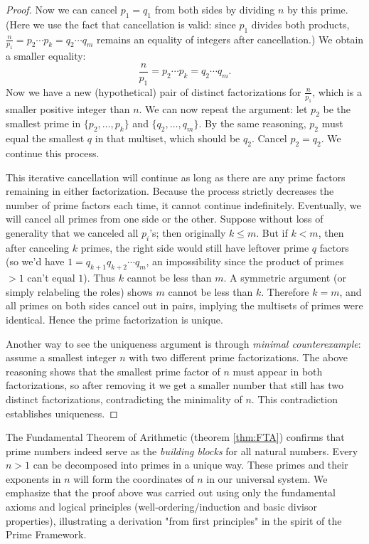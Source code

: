 \documentclass[11pt]{article}
\begin{document}
\begin{proof}
Now we can cancel $p_1 = q_1$ from both sides by dividing $n$ by this prime. (Here we use the fact that cancellation is valid: since $p_1$ divides both products, $\frac{n}{p_1} = p_2 \cdots p_k = q_2 \cdots q_m$ remains an equality of integers after cancellation.) We obtain a smaller equality:
\[ \frac{n}{p_1} = p_2 \cdots p_k = q_2 \cdots q_m. \]
Now we have a new (hypothetical) pair of distinct factorizations for $\frac{n}{p_1}$, which is a smaller positive integer than $n$. We can now repeat the argument: let $p_2$ be the smallest prime in $\{p_2,\dots,p_k\}$ and $\{q_2,\dots,q_m\}$. By the same reasoning, $p_2$ must equal the smallest $q$ in that multiset, which should be $q_2$. Cancel $p_2 = q_2$. We continue this process.

This iterative cancellation will continue as long as there are any prime factors remaining in either factorization. Because the process strictly decreases the number of prime factors each time, it cannot continue indefinitely. Eventually, we will cancel all primes from one side or the other. Suppose without loss of generality that we canceled all $p_i$'s; then originally $k \le m$. But if $k < m$, then after canceling $k$ primes, the right side would still have leftover prime $q$ factors (so we'd have $1 = q_{k+1} q_{k+2} \cdots q_{m}$, an impossibility since the product of primes $>1$ can’t equal $1$). Thus $k$ cannot be less than $m$. A symmetric argument (or simply relabeling the roles) shows $m$ cannot be less than $k$. Therefore $k = m$, and all primes on both sides cancel out in pairs, implying the multisets of primes were identical. Hence the prime factorization is unique.

Another way to see the uniqueness argument is through \emph{minimal counterexample}: assume a smallest integer $n$ with two different prime factorizations. The above reasoning shows that the smallest prime factor of $n$ must appear in both factorizations, so after removing it we get a smaller number that still has two distinct factorizations, contradicting the minimality of $n$. This contradiction establishes uniqueness.
\end{proof}

The Fundamental Theorem of Arithmetic (theorem \ref{thm:FTA}) confirms that prime numbers indeed serve as the \emph{building blocks} for all natural numbers. Every $n>1$ can be decomposed into primes in a unique way. These primes and their exponents in $n$ will form the coordinates of $n$ in our universal system. We emphasize that the proof above was carried out using only the fundamental axioms and logical principles (well-ordering/induction and basic divisor properties), illustrating a derivation "from first principles" in the spirit of the Prime Framework.
\end{document}
